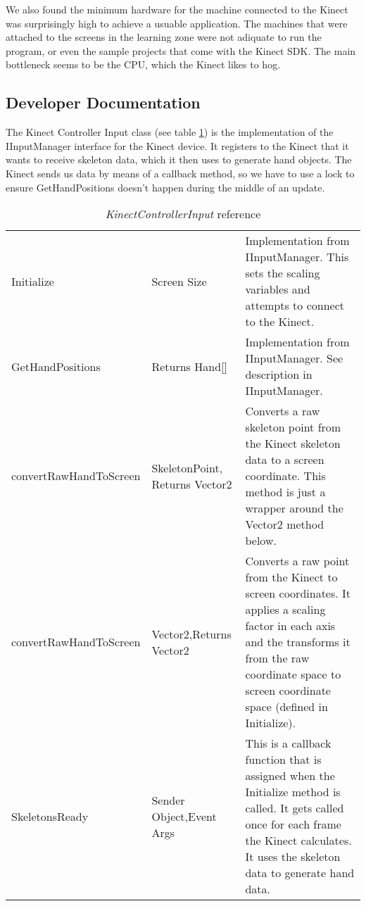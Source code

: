 We also found the minimum hardware for the machine connected to the Kinect was surprisingly high to achieve a usuable application.
The machines that were attached to the screens in the learning zone were not adiquate to run the program, or even the sample projects that come with the Kinect SDK.
The main bottleneck seems to be the CPU, which the Kinect likes to hog.

\subsection{Developer Documentation}
The Kinect Controller Input class (see table \ref{KinectInputRef}) is the implementation of the IInputManager interface for the Kinect device.
It registers to the Kinect that it wants to receive skeleton data, which it then uses to generate hand objects.
The Kinect sends us data by means of a callback method, so we have to use a lock to ensure GetHandPositions doesn't happen during the middle of an update.

\begin{table}[h]
\begin{tabular}{|>{\raggedright}p{5cm}|>{\raggedright}p{3.6cm}|>{\raggedright}p{7cm}|}
\hline 
\multicolumn{3}{|c|}{KinectControllerInput}\tabularnewline
\hline 
Initialize & Screen Size & Implementation from IInputManager. This sets the scaling variables
and attempts to connect to the Kinect.\tabularnewline
\hline 
GetHandPositions & Returns Hand{[}{]} & Implementation from IInputManager. See description in IInputManager.\tabularnewline
\hline 
convertRawHandToScreen & SkeletonPoint, Returns Vector2 & Converts a raw skeleton point from the Kinect skeleton data to a screen
coordinate. This method is just a wrapper around the Vector2 method
below.\tabularnewline
\hline 
convertRawHandToScreen & Vector2,\newline Returns Vector2 & Converts a raw point from the Kinect to screen coordinates. It applies
a scaling factor in each axis and the transforms it from the raw coordinate
space to screen coordinate space (defined in Initialize).\tabularnewline
\hline 
SkeletonsReady & Sender Object,\newline Event Args & This is a callback function that is assigned when the Initialize method
is called. It gets called once for each frame the Kinect calculates.
It uses the skeleton data to generate hand data.\tabularnewline
\hline 
\end{tabular}

\caption{\emph{KinectControllerInput} reference}

\label{KinectInputRef}
\end{table}

